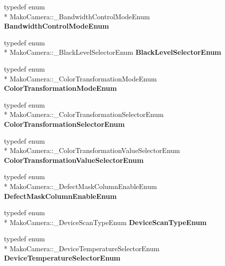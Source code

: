 \begin{DoxyCompactItemize}
\item 
\hypertarget{classMakoCamera_ad2b2f683c787d424242e13390c3841ea}{typedef enum \\*
Mako\-Camera\-::\-\_\-\-Bandwidth\-Control\-Mode\-Enum {\bfseries Bandwidth\-Control\-Mode\-Enum}}\label{classMakoCamera_ad2b2f683c787d424242e13390c3841ea}

\item 
\hypertarget{classMakoCamera_a9acd8f358d09f5d88c06fa119330338b}{typedef enum \\*
Mako\-Camera\-::\-\_\-\-Black\-Level\-Selector\-Enum {\bfseries Black\-Level\-Selector\-Enum}}\label{classMakoCamera_a9acd8f358d09f5d88c06fa119330338b}

\item 
\hypertarget{classMakoCamera_af7d46f0332c9676ce7b2267b25fe3d91}{typedef enum \\*
Mako\-Camera\-::\-\_\-\-Color\-Transformation\-Mode\-Enum {\bfseries Color\-Transformation\-Mode\-Enum}}\label{classMakoCamera_af7d46f0332c9676ce7b2267b25fe3d91}

\item 
\hypertarget{classMakoCamera_afc223967f742171fad366906f462698a}{typedef enum \\*
Mako\-Camera\-::\-\_\-\-Color\-Transformation\-Selector\-Enum {\bfseries Color\-Transformation\-Selector\-Enum}}\label{classMakoCamera_afc223967f742171fad366906f462698a}

\item 
\hypertarget{classMakoCamera_aa3b3c25a0674072934b1871f4c674e25}{typedef enum \\*
Mako\-Camera\-::\-\_\-\-Color\-Transformation\-Value\-Selector\-Enum {\bfseries Color\-Transformation\-Value\-Selector\-Enum}}\label{classMakoCamera_aa3b3c25a0674072934b1871f4c674e25}

\item 
\hypertarget{classMakoCamera_aa61277670b15c49ad278add43e3275d7}{typedef enum \\*
Mako\-Camera\-::\-\_\-\-Defect\-Mask\-Column\-Enable\-Enum {\bfseries Defect\-Mask\-Column\-Enable\-Enum}}\label{classMakoCamera_aa61277670b15c49ad278add43e3275d7}

\item 
\hypertarget{classMakoCamera_aa34b993c88168bdb2f23461889db99e0}{typedef enum \\*
Mako\-Camera\-::\-\_\-\-Device\-Scan\-Type\-Enum {\bfseries Device\-Scan\-Type\-Enum}}\label{classMakoCamera_aa34b993c88168bdb2f23461889db99e0}

\item 
\hypertarget{classMakoCamera_a7bbe59e5a6ca5ee5b64539b7fac823a6}{typedef enum \\*
Mako\-Camera\-::\-\_\-\-Device\-Temperature\-Selector\-Enum {\bfseries Device\-Temperature\-Selector\-Enum}}\label{classMakoCamera_a7bbe59e5a6ca5ee5b64539b7fac823a6}


\end{DoxyCompactItemize}
